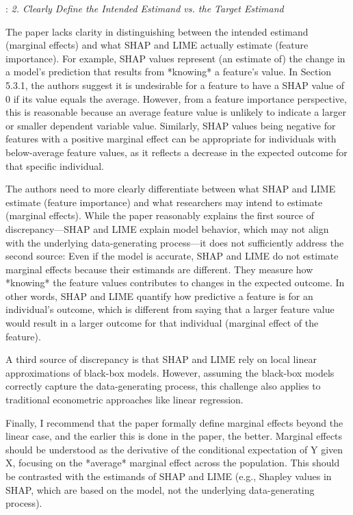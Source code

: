 \documentclass[11pt]{article}
\newcounter{se}[section]
\newcounter{reviewer}
\newcounter{point}[reviewer]
\renewcommand{\thepoint}{R\,\thereviewer.\arabic{point}}
\newenvironment{point}{
    \refstepcounter{point} \bigskip \noindent {\textbf{\thepoint}}: \rmfamily \itshape
}{\medskip}
\begin{document}
\begin{point}\label{q:discrepancy}
2.      Clearly Define the Intended Estimand vs. the Target Estimand

The paper lacks clarity in distinguishing between the intended estimand (marginal effects) and what SHAP and LIME actually estimate (feature importance). For example, SHAP values represent (an estimate of) the change in a model’s prediction that results from *knowing* a feature’s value. In Section 5.3.1, the authors suggest it is undesirable for a feature to have a SHAP value of 0 if its value equals the average. However, from a feature importance perspective, this is reasonable because an average feature value is unlikely to indicate a larger or smaller dependent variable value. Similarly, SHAP values being negative for features with a positive marginal effect can be appropriate for individuals with below-average feature values, as it reflects a decrease in the expected outcome for that specific individual.

The authors need to more clearly differentiate between what SHAP and LIME estimate (feature importance) and what researchers may intend to estimate (marginal effects). While the paper reasonably explains the first source of discrepancy—SHAP and LIME explain model behavior, which may not align with the underlying data-generating process—it does not sufficiently address the second source: Even if the model is accurate, SHAP and LIME do not estimate marginal effects because their estimands are different. They measure how *knowing* the feature values contributes to changes in the expected outcome. In other words, SHAP and LIME quantify how predictive a feature is for an individual’s outcome, which is different from saying that a larger feature value would result in a larger outcome for that individual (marginal effect of the feature).

A third source of discrepancy is that SHAP and LIME rely on local linear approximations of black-box models. However, assuming the black-box models correctly capture the data-generating process, this challenge also applies to traditional econometric approaches like linear regression.

Finally, I recommend that the paper formally define marginal effects beyond the linear case, and the earlier this is done in the paper, the better. Marginal effects should be understood as the derivative of the conditional expectation of Y given X, focusing on the *average* marginal effect across the population. This should be contrasted with the estimands of SHAP and LIME (e.g., Shapley values in SHAP, which are based on the model, not the underlying data-generating process).

\end{point}
\end{document}
